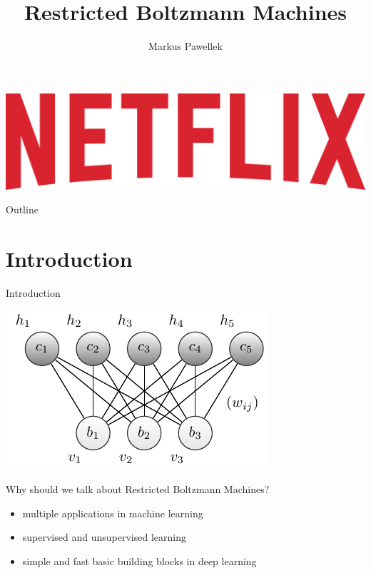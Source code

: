 \documentclass[aspectratio=169]{beamer}
\title{Restricted Boltzmann Machines}
\author{Markus Pawellek}
\begin{document}

  \begin{frame}
    \vfill
    \includegraphics[width=\textwidth]{images/netflix-logo.jpg}
    \vfill
  \end{frame}

  \frame{\titlepage}
  \begin{frame}{Outline}
    \footnotesize
    \hfill\parbox[t][7cm][l]{0.9\textwidth}{\tableofcontents}
  \end{frame}

  \section{Introduction} %
  \label{sec:introduction}
    \begin{frame}{Introduction}
      \begin{center}
        \includegraphics[height=0.35\textheight]{figures/rbm-scheme.pdf}
      \end{center}

      Why should we talk about Restricted Boltzmann Machines?
      \begin{itemize}
        \pause
        \item multiple applications in machine learning
        \pause
        \item supervised and unsupervised learning
        \pause
        \item simple and fast basic building blocks in deep learning
      \end{itemize}
    \end{frame}
\end{document}
